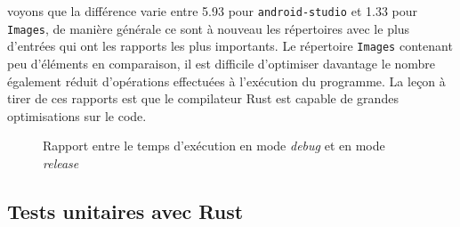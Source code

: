 voyons que la différence varie entre 5.93 pour \texttt{android-studio} et 1.33 pour 
\texttt{Images}, de manière générale ce sont à nouveau les répertoires 
avec le plus d'entrées qui ont les rapports les plus importants. Le répertoire \texttt{Images} 
contenant peu d'éléments en comparaison, il est difficile d'optimiser davantage le nombre 
également réduit d'opérations effectuées à l'exécution du programme. La leçon à tirer de ces rapports est 
que le compilateur Rust est capable de grandes optimisations sur le code.
\begin{figure}
    \begin{center}
    \end{center}
    \caption{Rapport entre le temps d'exécution en mode \textit{debug} et en mode \textit{release}}
    \label{histo2}
\end{figure}
\subsection{Tests unitaires avec Rust}
